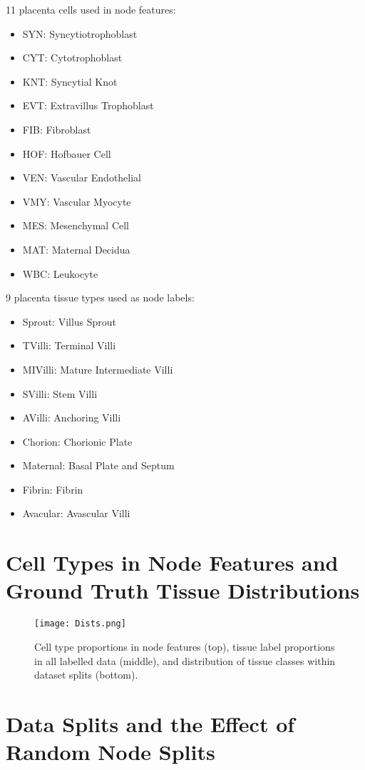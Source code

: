 \documentclass{article}
\begin{document}
11 placenta cells used in node features:
\begin{itemize}
\item SYN: Syncytiotrophoblast
\item CYT: Cytotrophoblast
\item KNT: Syncytial Knot
\item EVT: Extravillus Trophoblast
\item FIB: Fibroblast
\item HOF: Hofbauer Cell
\item VEN: Vascular Endothelial
\item VMY: Vascular Myocyte
\item MES: Mesenchymal Cell
\item MAT: Maternal Decidua
\item WBC: Leukocyte
\end{itemize}

9 placenta tissue types used as node labels:
\begin{itemize}
\item Sprout: Villus Sprout
\item TVilli: Terminal Villi
\item MIVilli: Mature Intermediate Villi
\item SVilli: Stem Villi
\item AVilli: Anchoring Villi
\item Chorion: Chorionic Plate
\item Maternal: Basal Plate and Septum
\item Fibrin: Fibrin
\item Avacular: Avascular Villi
\end{itemize}

\pagebreak
\section{Cell Types in Node Features and Ground Truth Tissue Distributions}
\label{distributions}

\begin{figure}[h]
  \centering
  \texttt{[image: Dists.png]}
  \caption{Cell type proportions in node features (top), tissue label proportions in all labelled data (middle), and distribution of tissue classes within dataset splits (bottom).}
\end{figure}

\pagebreak
\section{Data Splits and the Effect of Random Node Splits}
\label{splits}
\end{document}
